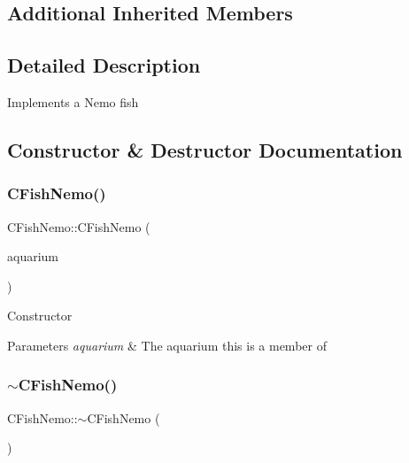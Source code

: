 \subsection*{Additional Inherited Members}


\subsection{Detailed Description}
Implements a Nemo fish 

\subsection{Constructor \& Destructor Documentation}
\mbox{\label{class_c_fish_nemo_ab5cc8d119b0c9d8dc62a0e2b6f6e731d}} 
\subsubsection{\texorpdfstring{C\+Fish\+Nemo()}{CFishNemo()}}
{\footnotesize\ttfamily C\+Fish\+Nemo\+::\+C\+Fish\+Nemo (\begin{DoxyParamCaption}\item[{\mbox{\hyperlink{class_c_aquarium}{C\+Aquarium}} $\ast$}]{aquarium }\end{DoxyParamCaption})}

Constructor 
\begin{DoxyParams}{Parameters}
{\em aquarium} & The aquarium this is a member of \\
\hline
\end{DoxyParams}
\mbox{\label{class_c_fish_nemo_ac37da91b4738144d3b47674450861b26}} 
\subsubsection{\texorpdfstring{$\sim$\+C\+Fish\+Nemo()}{~CFishNemo()}}
{\footnotesize\ttfamily C\+Fish\+Nemo\+::$\sim$\+C\+Fish\+Nemo (\begin{DoxyParamCaption}{ }\end{DoxyParamCaption})\hspace{0.3cm}{\ttfamily [virtual]}}

